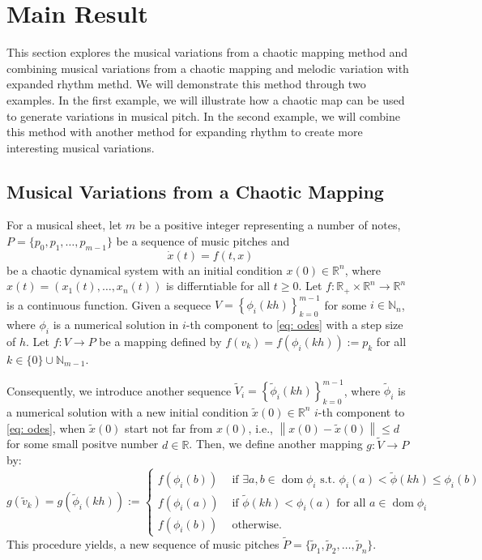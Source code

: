 \documentclass[11pt]{article}
\theoremstyle{definition}
\DeclareMathOperator{\dom}{dom}
\begin{document}
\section{Main Result}
This section explores the musical variations from a chaotic mapping method and combining musical variations from a chaotic mapping and melodic variation with expanded rhythm methd. We will demonstrate this method through two examples. In the first example, we will illustrate how a chaotic map can be used to generate variations in musical pitch. In the second example, we will combine this method with another method for expanding rhythm to create more interesting musical variations.

\subsection{Musical Variations from a Chaotic Mapping}

For a musical sheet, let $m$ be a positive integer representing a number of notes, $P = \{p_0, p_1, \dots, p_{m-1}\}$ be a sequence of music pitches and  
\begin{equation} \label{eq: odes}
\dot{x}(t) = f(t,x)
\end{equation}
be a chaotic dynamical system with an initial condition $x(0) \in \mathbb{R}^n$, where $x(t) = \left(x_1(t), \ldots, x_n(t)\right)$ is differntiable for all $t \geq 0$.
Let $f: \mathbb{R}_{+} \times \mathbb{R}^n \to \mathbb{R}^n$ is a continuous function. 
Given a sequece
$ V = \displaystyle\left\{\phi_i(kh) \right\}_{k=0}^{m-1}$ 
for some $i \in \mathbb{N}_n$, where $\phi_i$ is a numerical solution in $i$-th component to \eqref{eq: odes} with a step size of $h$.
Let $ f: V \to P$ be a mapping defined by 
$f(v_k) = f(\phi_i(kh)) := p_k$ for all $k \in \{0\}\cup\mathbb{N}_{m-1}$.

Consequently, we introduce another sequence $\widetilde{V}_i = \left\{\tilde{\phi}_i(kh) \right\}_{k=0}^{m-1}$, where $\tilde{\phi}_i$ is a numerical solution with a new initial condition $\tilde{x}(0) \in \mathbb{R}^n$ $i$-th component to \eqref{eq: odes}, 
when $\tilde{x}(0)$ start not far from $x(0)$, i.e., $ \left\lVert x(0) - \tilde{x}(0) \right\rVert \leq d$ for some small positve number $d \in \mathbb{R}$. Then, we define another mapping $g: \widetilde{V} \to P$ by: 
\[ g(\tilde{v}_k) = g\left(\tilde{\phi}_i(kh)\right) := 
\begin{cases}
  f(\phi_i(b)) & \text{ if }\exists a, b \in \dom{\phi_i} \text{ s.t. } \phi_i(a) < \tilde{\phi}(kh) \leq \phi_i(b) \\
  f(\phi_i(a)) & \text{ if } \tilde{\phi}(kh) < \phi_i(a) \text{ for all } a \in \dom{\phi_i} \\
  f(\phi_i(b)) & \text{ otherwise} .
\end{cases}
\]
This procedure yields, a new sequence of music pitches $\widetilde{P} =\{ \tilde{p}_1, \tilde{p}_2, \dots, \tilde{p}_n \}$.
\end{document}
